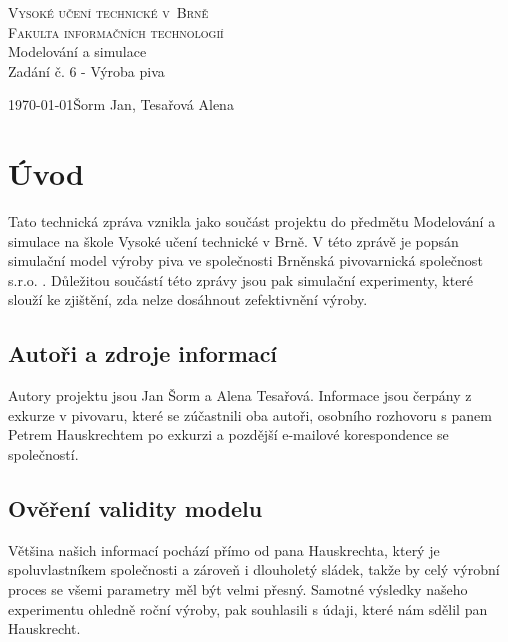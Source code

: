\documentclass[11pt,a4paper]{article}
\author{Jan Šorm}
\begin{document}
\pagestyle{headings}
\begin{titlepage}
	\begin{center}
		{\Huge\textsc{Vysoké učení technické v~Brně}}\\
		\medskip
		{\huge\textsc{Fakulta informačních technologií}}\\
		{\LARGE Modelování a simulace}\\
		\medskip
		{\Huge Zadání č. 6 - Výroba piva}\\
	\end{center}
	{\Large\today \hfill Šorm Jan, Tesařová Alena}
\end{titlepage}

\tableofcontents
\newpage

\section{Úvod}
Tato technická zpráva vznikla jako součást projektu do předmětu Modelování a simulace na škole Vysoké učení technické v Brně. V této zprávě je popsán simulační model \cite[str. 7]{pred} výroby piva ve společnosti Brněnská pivovarnická společnost s.r.o. \cite{pivo}. Důležitou součástí této zprávy jsou pak simulační experimenty, které slouží ke zjištění, zda nelze dosáhnout zefektivnění výroby.

\subsection{Autoři a zdroje informací}
Autory projektu jsou Jan Šorm a Alena Tesařová. Informace jsou čerpány z exkurze v pivovaru, které se zúčastnili oba autoři, osobního rozhovoru s panem Petrem Hauskrechtem po exkurzi a pozdější e-mailové korespondence se společností.

\subsection{Ověření validity modelu}
Většina našich informací pochází přímo od pana Hauskrechta, který je spoluvlastníkem společnosti a zároveň i dlouholetý sládek, takže by celý výrobní proces se všemi parametry měl být velmi přesný. Samotné výsledky našeho experimentu ohledně roční výroby, pak souhlasili s údaji, které nám sdělil pan Hauskrecht.

	
\end{document}
